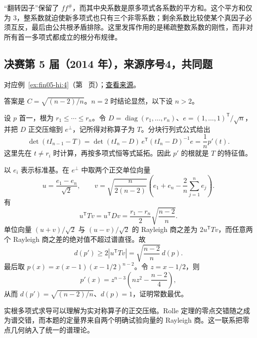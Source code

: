 \documentclass[12pt,fontset=fandol]{ctexart}
\begin{document}
\begin{remark}[方法与条件]

“翻转因子”保留了 $ff^\#$，而其中央系数是原多项式各系数的平方和。这个平方和仅为 $3$，整系数就迫使新多项式也只有三个非零系数；剩余系数比较使某个真因子必须互反，最后由公共根矛盾排除。这里发挥作用的是稀疏整数系数的刚性，而非对所有首一多项式都成立的根分布规律。

\end{remark}

\subsection{决赛第 5 届（2014 年），来源序号4，共同题}\label{ans:fin05-hi:4}\label{pr:fin05-hi:4}

对应例~\ref{ex:fin05-hi:4}（第~\pageref{ex:fin05-hi:4} 页）；\href{https://github.com/lzxcr/cmc-mathematics/blob/64916fa1fdbc3e444a652eca204d5669058ee321/src/problems/finals/05/04.md}{查看来源}。

\begin{solve}

答案是 $C=\sqrt{(n-2)/n}$。$n=2$ 时结论显然，以下设 $n>2$。

设 $p$ 首一，根为 $r_1\le\cdots\le r_n$。令
$D=\operatorname{diag}(r_1,\ldots,r_n)$、$e=(1,\ldots,1)^{\mathsf T}/\sqrt n$，并把 $D$ 正交压缩到 $e^\perp$，记所得对称算子为 $T$。分块行列式公式给出
\[
\det(tI_{n-1}-T)
=\det(tI_n-D)\,e^{\mathsf T}(tI_n-D)^{-1}e
=\frac1n p'(t).
\]
这里先在 $t\ne r_i$ 时计算，再按多项式恒等式延拓。因此 $p'$ 的根就是 $T$ 的特征值。

以 $e_i$ 表示标准基。在 $e^\perp$ 中取两个正交单位向量
\[
u=\frac{e_1-e_n}{\sqrt2},\qquad
v=\sqrt{\frac{n}{2(n-2)}}
\left(e_1+e_n-\frac2n\sum_{j=1}^n e_j\right).
\]
有
\[
u^{\mathsf T}Tv=u^{\mathsf T}Dv
=\frac{r_1-r_n}{2}\sqrt{\frac{n-2}{n}}.
\]
单位向量 $(u+v)/\sqrt2$ 与 $(u-v)/\sqrt2$ 的 Rayleigh 商之差为 $2u^{\mathsf T}Tv$，而任意两个 Rayleigh 商之差的绝对值不超过谱直径。故
\[
d(p')\ge2|u^{\mathsf T}Tv|=\sqrt{\frac{n-2}{n}}\,d(p).
\]
最后取 $p(x)=x(x-1)(x-1/2)^{n-2}$。令 $z=x-1/2$，则
\[
p'(x)=z^{n-3}\left(nz^2-\frac{n-2}{4}\right),
\]
从而 $d(p')=\sqrt{(n-2)/n}$、$d(p)=1$，证明常数最优。

\end{solve}

\begin{remark}[方法与条件]

实根多项式求导可以理解为实对称算子的正交压缩。Rolle 定理的零点交错随之成为谱交错，而本题的定量界来自两个明确试验向量的 Rayleigh 商。这一联系把零点几何纳入了统一的谱理论。

\end{remark}
\end{document}
